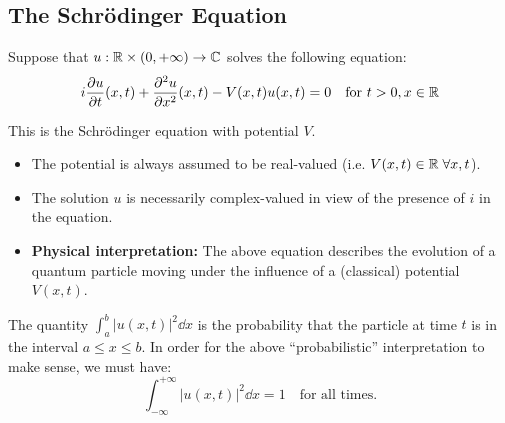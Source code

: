 \begin{center}
\end{center}

\newpage
\subsection{The Schrödinger Equation}

Suppose that $u : \mathbb{R} \times (0, +\infty) \rightarrow \mathbb{C}$ solves the following equation:
\begin{equation}
    i \frac{\partial u}{\partial t}(x,t) + \frac{\partial^2 u}{\partial x^2}(x,t) - V(x,t)u(x,t) = 0 \quad \text{for } t>0, x \in \mathbb{R}
\end{equation}

This is the Schrödinger equation with potential $V$.

\begin{itemize}
    \item The potential is always assumed to be real-valued (i.e. $V(x,t) \in \mathbb{R} \;\forall x,t$).
    \item The solution $u$ is necessarily complex-valued in view of the presence of $i$ in the equation.
    \item \textbf{Physical interpretation:} The above equation describes the evolution of a quantum particle moving under the influence of a (classical) potential $V(x,t)$.
\end{itemize}

The quantity $\int_a^b |u(x,t)|^2 \dd x$ is the probability that the particle at time $t$ is in the interval $a \leq x \leq b$. In order for the above ``probabilistic'' interpretation to make sense, we must have:
$$ \int_{-\infty}^{+\infty} |u(x,t)|^2 \dd x = 1 \quad \text{for all times.} $$

